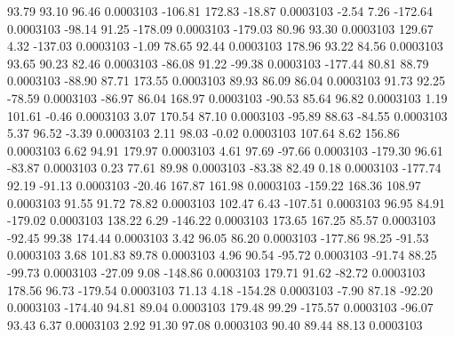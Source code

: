        93.79       93.10       96.46     0.0003103
     -106.81      172.83      -18.87     0.0003103
       -2.54        7.26     -172.64     0.0003103
      -98.14       91.25     -178.09     0.0003103
     -179.03       80.96       93.30     0.0003103
      129.67        4.32     -137.03     0.0003103
       -1.09       78.65       92.44     0.0003103
      178.96       93.22       84.56     0.0003103
       93.65       90.23       82.46     0.0003103
      -86.08       91.22      -99.38     0.0003103
     -177.44       80.81       88.79     0.0003103
      -88.90       87.71      173.55     0.0003103
       89.93       86.09       86.04     0.0003103
       91.73       92.25      -78.59     0.0003103
      -86.97       86.04      168.97     0.0003103
      -90.53       85.64       96.82     0.0003103
        1.19      101.61       -0.46     0.0003103
        3.07      170.54       87.10     0.0003103
      -95.89       88.63      -84.55     0.0003103
        5.37       96.52       -3.39     0.0003103
        2.11       98.03       -0.02     0.0003103
      107.64        8.62      156.86     0.0003103
        6.62       94.91      179.97     0.0003103
        4.61       97.69      -97.66     0.0003103
     -179.30       96.61      -83.87     0.0003103
        0.23       77.61       89.98     0.0003103
      -83.38       82.49        0.18     0.0003103
     -177.74       92.19      -91.13     0.0003103
      -20.46      167.87      161.98     0.0003103
     -159.22      168.36      108.97     0.0003103
       91.55       91.72       78.82     0.0003103
      102.47        6.43     -107.51     0.0003103
       96.95       84.91     -179.02     0.0003103
      138.22        6.29     -146.22     0.0003103
      173.65      167.25       85.57     0.0003103
      -92.45       99.38      174.44     0.0003103
        3.42       96.05       86.20     0.0003103
     -177.86       98.25      -91.53     0.0003103
        3.68      101.83       89.78     0.0003103
        4.96       90.54      -95.72     0.0003103
      -91.74       88.25      -99.73     0.0003103
      -27.09        9.08     -148.86     0.0003103
      179.71       91.62      -82.72     0.0003103
      178.56       96.73     -179.54     0.0003103
       71.13        4.18     -154.28     0.0003103
       -7.90       87.18      -92.20     0.0003103
     -174.40       94.81       89.04     0.0003103
      179.48       99.29     -175.57     0.0003103
      -96.07       93.43        6.37     0.0003103
        2.92       91.30       97.08     0.0003103
       90.40       89.44       88.13     0.0003103
